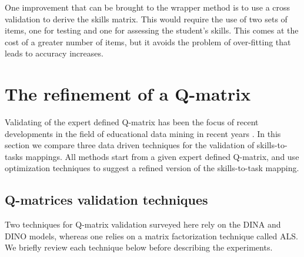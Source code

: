 One improvement that can be brought to the wrapper method is to use a cross validation to derive the skills matrix.  This would require the use of two sets of items, one for testing and one for assessing the student's skills.  This comes at the cost of a greater number of items, but it avoids the problem of over-fitting that leads to accuracy increases.

\section{The refinement of a Q-matrix}
\label{edm2014}

Validating of the expert defined Q-matrix has been the focus of recent developments in the field of educational data mining in recent years \citep{delaTorre2008,chiu2013statistical,barnes2010novel,loye2011validite,Desmarais2013aied}.
In this section we compare three data driven techniques for the validation of skills-to-tasks mappings.  All methods start from a given expert defined Q-matrix, and use optimization techniques to suggest a refined version of the skills-to-task mapping.  


\subsection{Q-matrices validation techniques}

Two techniques for Q-matrix validation surveyed here rely on the DINA and DINO models, whereas one relies on a matrix factorization technique called ALS.  We briefly review each technique below before describing the experiments.


